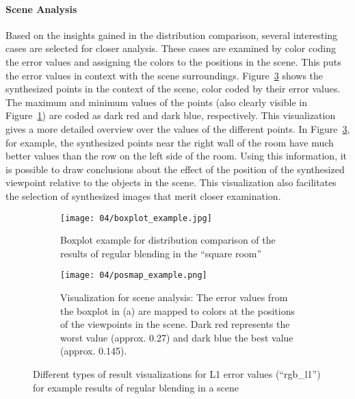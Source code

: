 \paragraph{Scene Analysis}
Based on the insights gained in the distribution comparison, several interesting cases are selected for closer analysis. These cases are examined by color coding the error values and assigning the colors to the positions in the scene. This puts the error values in context with the scene surroundings. Figure~\ref{fig:posmap_example} shows the synthesized points in the context of the scene, color coded by their error values. The maximum and minimum values of the points (also clearly visible in Figure~\ref{fig:boxplot_example}) are coded as dark red and dark blue, respectively. This visualization gives a more detailed overview over the values of the different points. In Figure~\ref{fig:posmap_example}, for example, the synthesized points near the right wall of the room have much better values than the row on the left side of the room. Using this information, it is possible to draw conclusions about the effect of the position of the synthesized viewpoint relative to the objects in the scene. This visualization also facilitates the selection of synthesized images that merit closer examination.

\begin{figure}
\centering
    \hfill
    \begin{subfigure}[c]{0.5\textwidth}
            \centering
            \texttt{[image: 04/boxplot\_example.jpg]}
            \caption{Boxplot example for distribution comparison of the results of regular blending in the ``square room''} \label{fig:boxplot_example}
    \end{subfigure}%
    \hfill
    \begin{subfigure}[c]{0.5\textwidth}
            \centering
            \texttt{[image: 04/posmap\_example.png]}
            \caption{Visualization for scene analysis: The error values from the boxplot in (a) are mapped to colors at the positions of the viewpoints in the scene. Dark red represents the worst value (approx. 0.27) and dark blue the best value (approx. 0.145).} \label{fig:posmap_example}
    \end{subfigure}
    \hfill
  \caption[Different types of result visualizations for L1 error values]{Different types of result visualizations for L1 error values (``rgb\_l1'') for example results of regular blending in a scene}
\end{figure}

